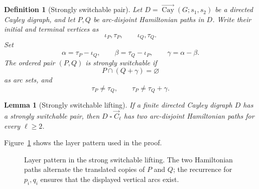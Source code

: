 \documentclass[11pt]{article}
\newtheorem{lemma}[theorem]{Lemma}
\newtheorem{definition}[theorem]{Definition}
\newcommand{\Cay}{\overrightarrow{\operatorname{Cay}}}
\newcommand{\Boxprod}{\mathbin{\square}}
\begin{document}
\begin{definition}[Strongly switchable pair]\label{def:strong-switchable}
Let $D=\Cay(G;s_1,s_2)$ be a directed Cayley digraph, and let $P,Q$ be arc-disjoint Hamiltonian paths in $D$.  Write their initial and terminal vertices as
\[
        \iota_P,\tau_P,
        \qquad
        \iota_Q,\tau_Q.
\]
Set
\[
        \alpha=\tau_P-\iota_Q,
        \qquad
        \beta=\tau_Q-\iota_P,
        \qquad
        \gamma=\alpha-\beta.
\]
The ordered pair $(P,Q)$ is strongly switchable if
\[
        P\cap(Q+\gamma)=\varnothing
\]
as arc sets, and
\[
        \tau_P\ne\tau_Q,
        \qquad
        \tau_P\ne\tau_Q+
        \gamma.
\]
\end{definition}

\begin{lemma}[Strongly switchable lifting]\label{lem:strong-lifting}
If a finite directed Cayley digraph $D$ has a strongly switchable pair, then $D\Boxprod\vec C_\ell$ has two arc-disjoint Hamiltonian paths for every $\ell\ge2$.
\end{lemma}

Figure~\ref{fig:strong-lifting} shows the layer pattern used in the proof.

\begin{figure}[H]
\centering
{}
\caption{Layer pattern in the strong switchable lifting.  The two Hamiltonian paths alternate the translated copies of $P$ and $Q$; the recurrence for $p_i,q_i$ ensures that the displayed vertical arcs exist.}
\label{fig:strong-lifting}
\end{figure}
\end{document}
